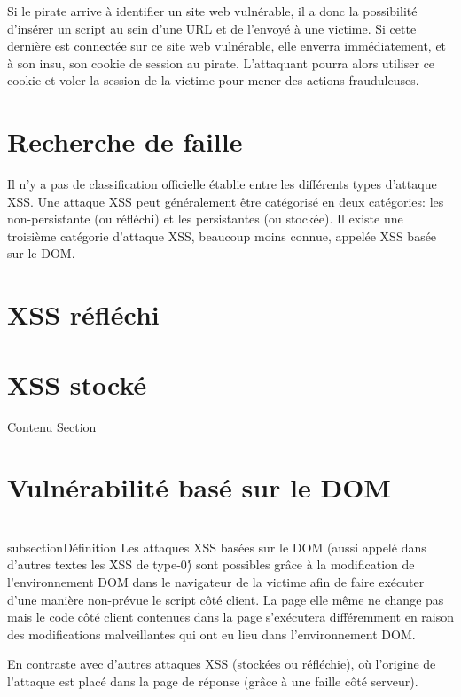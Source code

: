 \documentclass[a4paper,12pt]{report}
\begin{document}
  Si le pirate arrive à identifier un site web vulnérable, il a donc la possibilité d’insérer un script au sein d’une URL et de l’envoyé à une victime. Si cette dernière est connectée sur ce site web vulnérable, elle enverra immédiatement, et à son insu, son cookie de session au pirate. L'attaquant pourra alors utiliser ce cookie et voler la session de la victime pour mener des actions frauduleuses.

    \newpage


  \section{Recherche de faille}



    \newpage

Il n'y a pas de classification officielle établie entre les différents types d'attaque XSS. Une attaque XSS peut généralement être catégorisé en deux catégories: les non-persistante (ou réfléchi) et les persistantes (ou stockée). Il existe une troisième catégorie d'attaque XSS, beaucoup moins connue, appelée XSS basée sur le DOM.

\section{XSS réfléchi}



    \newpage

\section{XSS stocké}
    Contenu Section


\section{Vulnérabilité basé sur le DOM}
  \\subsection{Définition} %
  \label{sub:d_finition}
  Les attaques XSS basées sur le DOM (aussi appelé dans d'autres textes les \'XSS de type-0\') sont possibles grâce à la modification de l'environnement DOM dans le navigateur de la victime afin de faire exécuter d'une manière non-prévue le script côté client. La page elle même ne change pas mais le code côté client contenues dans la page s'exécutera différemment en raison des modifications malveillantes qui ont eu lieu dans l'environnement DOM.

  En contraste avec d'autres attaques XSS (stockées ou réfléchie), où l'origine de l'attaque est placé dans la page de réponse (grâce à une faille côté serveur).
\end{document}
